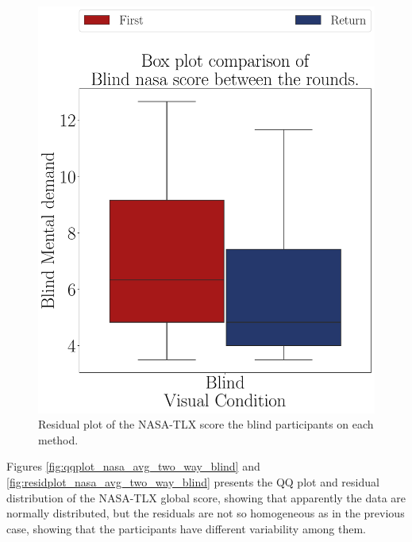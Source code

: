 \begin{figure}[!htb]
\begin{minipage}{0.45\textwidth}
        \includegraphics[width = \textwidth]{Resultados/Nasa/Figuras/pdf/boxplot_nasa_blind_rounds.pdf}
        \caption{Residual plot of the NASA-TLX score the blind participants on each method.}
        \label{fig:boxplot_nasa_blind_rounds}
    \end{minipage}
\end{figure}

Figures \ref{fig:qqplot_nasa_avg_two_way_blind} and \ref{fig:residplot_nasa_avg_two_way_blind} presents the QQ plot and residual distribution of the NASA-TLX global score, showing that apparently the data are normally distributed, but the residuals are not so homogeneous as in the previous case, showing that the participants have different variability among them.

